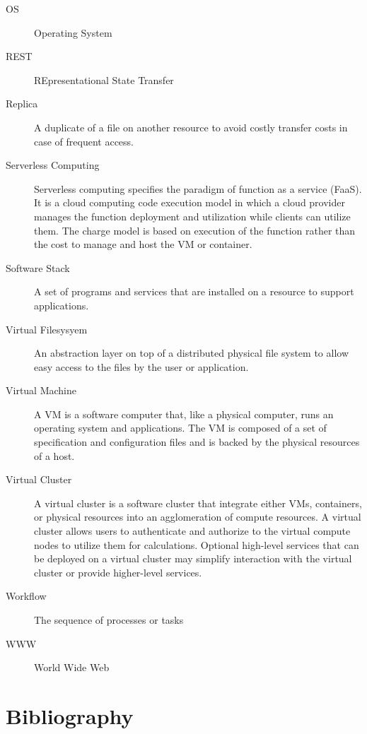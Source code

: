 \documentclass[9pt,]{article}
\begin{document}
\begin{description}
\item[OS]
Operating System
\item[REST]
REpresentational State Transfer
\item[Replica]
A duplicate of a file on another resource to avoid costly transfer costs
in case of frequent access.
\item[Serverless Computing]
Serverless computing specifies the paradigm of function as a service
(FaaS). It is a cloud computing code execution model in which a cloud
provider manages the function deployment and utilization while clients
can utilize them. The charge model is based on execution of the function
rather than the cost to manage and host the VM or container.
\item[Software Stack]
A set of programs and services that are installed on a resource to
support applications.
\item[Virtual Filesysyem]
An abstraction layer on top of a distributed physical file system to
allow easy access to the files by the user or application.
\item[Virtual Machine]
A VM is a software computer that, like a physical computer, runs an
operating system and applications. The VM is composed of a set of
specification and configuration files and is backed by the physical
resources of a host.
\item[Virtual Cluster]
A virtual cluster is a software cluster that integrate either VMs,
containers, or physical resources into an agglomeration of compute
resources. A virtual cluster allows users to authenticate and authorize
to the virtual compute nodes to utilize them for calculations. Optional
high-level services that can be deployed on a virtual cluster may
simplify interaction with the virtual cluster or provide higher-level
services.
\item[Workflow]
The sequence of processes or tasks
\item[WWW]
World Wide Web
\end{description}

\hypertarget{bibliography}{%
\section{Bibliography}\label{bibliography}}
\end{document}
